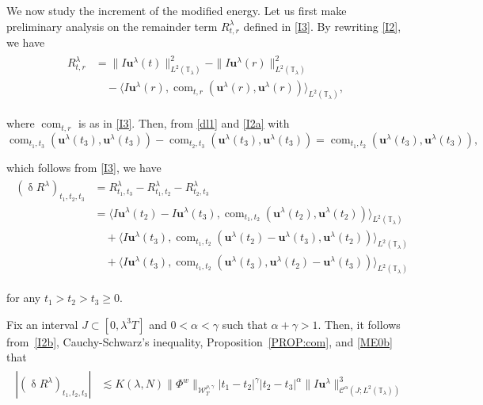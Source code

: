 \documentclass[letterpaper, 11pt,  reqno]{amsart}
\DeclareMathOperator{\com}{com}
\newcommand{\1}{\hspace{0.5mm}\text{I}\hspace{0.5mm}}
\newcommand{\noi}{\noindent}
\newcommand{\T}{\mathbb{T}}
\newcommand{\CC}{\mathcal{C}}
\newcommand{\al}{\alpha}
\newcommand{\updl}{\updelta}
\newcommand{\g}{\gamma}
\newcommand{\ld}{\lambda}
\newcommand{\les}{\lesssim}
\newcommand{\W}{\mathcal{W}}
\newcommand{\uu}{\mathbf{u}}
\numberwithin{equation}{section}
\numberwithin{theorem}{section}
\begin{document}
We now study the increment of the modified energy.
Let us first make preliminary analysis
on the remainder term
 $R^\ld_{t,r}$ defined in \eqref{I3}.
By rewriting \eqref{I2}, we have
\begin{align}
\begin{split}
R^\ld_{t,r} &=  \| I \uu^\ld(t) \|^2_{L^2(\T_\ld)} -  \| I \uu^\ld(r) \|^2_{L^2(\T_\ld)}\\
& \quad 
- \big\langle 
I \uu^\ld(r)  ,   \com_{t, r}(\uu^\ld(r), \uu^\ld(r))
\big\rangle_{L^2(\T_\ld)} , 
\end{split}
\label{I2a}
\end{align}

\noi
where
$\com_{t, r}$ is  as in 
\eqref{I3}.
Then, 
from \eqref{dl1} and \eqref{I2a}
with 
\[  \com_{t_1, t_3}(\uu^\ld(t_3), \uu^\ld(t_3))
-    \com_{t_2, t_3}(\uu^\ld(t_3), \uu^\ld(t_3))
=   \com_{t_1, t_2}(\uu^\ld(t_3), \uu^\ld(t_3)), \]

%
\noi
which follows from \eqref{I3}, 
we have 
\begin{align}
\begin{aligned}
(\updl R^\ld)_{t_1, t_2, t_3} 
& = R^\ld_{t_1,t_3}-  R^\ld_{t_1, t_2}-   R^\ld_{t_2, t_3}\\
&=
\big\langle 
I \uu^\ld(t_2) - I \uu^\ld(t_3)  ,   \com_{t_1, t_2}(\uu^\ld(t_2), \uu^\ld(t_2))
\big\rangle_{L^2(\T_\ld)} \\
& \quad +  \big\langle 
I \uu^\ld(t_3)  ,   \com_{t_1, t_2}(\uu^\ld(t_2)- \uu^\ld(t_3), \uu^\ld(t_2))
\big\rangle_{L^2(\T_\ld)}\\
& \quad +  \big\langle 
I \uu^\ld(t_3)  ,   \com_{t_1, t_2}(\uu^\ld(t_3), \uu^\ld(t_2)- \uu^\ld(t_3))
\big\rangle_{L^2(\T_\ld)}
\end{aligned}
\label{I2b}
\end{align}

\noi
for any  $t_1 >   t_2> t_3\ge 0$.

Fix an interval $J \subset [0, \ld^3T]$
and $0 < \al < \g$ such that $\al + \g > 1$.
Then, it follows from~\eqref{I2b}, Cauchy-Schwarz's inequality, 
Proposition~\ref{PROP:com}, 
and \eqref{ME0b}
that  
\begin{align*}
\begin{aligned}
|(\updl R^\ld)_{t_1, t_2, t_3} |
&\les K(\ld, N)   \|  \Phi^{w}  \|_{\W_{T}^{\rho, \g}}   
|t_1-t_2|^{\g}
|t_2-t_3|^{\al}\|I \uu^\ld \|^3_{\CC^\al (J;L^2(\T_\ld))}
\end{aligned}
\end{align*}
\end{document}
